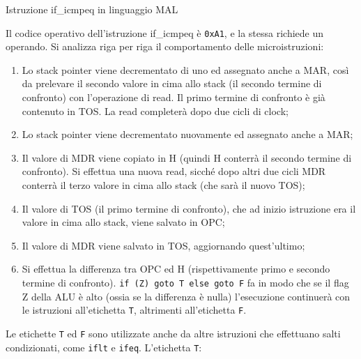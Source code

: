 \begin{code}
    \inputminted{text}{mal-ajvm/if_icmpeq.mal}
    \caption{Istruzione if\_icmpeq in linguaggio MAL}
    \label{cod:if_icmpeq_mal}
\end{code}

Il codice operativo dell'istruzione if\_icmpeq è \texttt{0xA1}, e la stessa richiede un operando. Si analizza riga per riga il comportamento delle microistruzioni:

\begin{enumerate}
    \item Lo stack pointer viene decrementato di uno ed assegnato anche a MAR, così da prelevare il secondo valore in cima allo stack (il secondo termine di confronto) con l'operazione di read. Il primo termine di confronto è già contenuto in TOS. La read completerà dopo due cicli di clock;
    \item Lo stack pointer viene decrementato nuovamente ed assegnato anche a MAR;
    \item Il valore di MDR viene copiato in H (quindi H conterrà il secondo termine di confronto). Si effettua una nuova read, sicché dopo altri due cicli MDR conterrà il terzo valore in cima allo stack (che sarà il nuovo TOS);
    \item Il valore di TOS (il primo termine di confronto), che ad inizio istruzione era il valore in cima allo stack, viene salvato in OPC;
    \item Il valore di MDR viene salvato in TOS, aggiornando quest'ultimo;
    \item Si effettua la differenza tra OPC ed H (rispettivamente primo e secondo termine di confronto). \texttt{if (Z) goto T else goto F} fa in modo che se il flag Z della ALU è alto (ossia se la differenza è nulla) l'esecuzione continuerà con le istruzioni all'etichetta \texttt{T}, altrimenti all'etichetta \texttt{F}.
\end{enumerate}

Le etichette \texttt{T} ed \texttt{F} sono utilizzate anche da altre istruzioni che effettuano salti condizionati, come \texttt{iflt} e \texttt{ifeq}. L'etichetta \texttt{T}:

